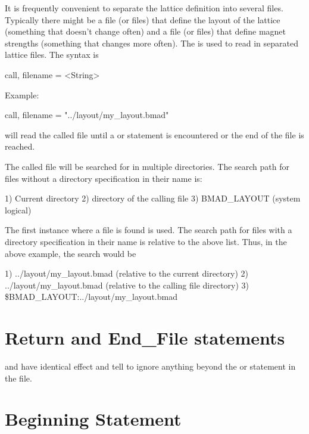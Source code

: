 It is frequently convenient to separate the lattice definition into
several files.  Typically there might be a file (or files) that define
the layout of the lattice (something that doesn't change often) and a
file (or files) that define magnet strengths (something that changes
more often).  The  is used to read in separated lattice
files. The syntax is
\begin{example}
  call, filename = <String>
\end{example}
Example:
\begin{example}
  call, filename = "../layout/my_layout.bmad"
\end{example}
\bmad will read the called file until a  or 
statement is encountered or the end of the file is reached.

The called file will be searched for in multiple directories.
The search path for files without a directory specification in their name is:
\begin{example}
	1) Current directory
	2) directory of the calling file
	3) BMAD_LAYOUT (system logical)
\end{example}
The first instance where a file is found is used.
The search path for files with a directory specification in their name
is relative to the above list. Thus, in the above example, the search
would be
\begin{example}
  1) ../layout/my_layout.bmad  (relative to the current directory)
  2) ../layout/my_layout.bmad  (relative to the calling file directory)
  3) \$BMAD_LAYOUT:../layout/my_layout.bmad 
\end{example}

\section{Return and End\_File statements}

 and  have identical effect and tell \bmad to
ignore anything beyond the  or  statement in
the file.

\section{Beginning Statement}
\label{s:beginning}

